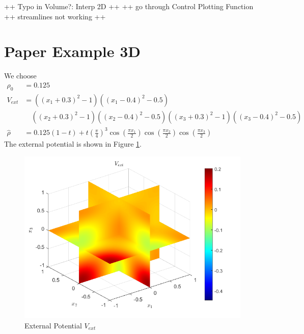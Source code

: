 \documentclass[11pt, a4paper]{article}
\theoremstyle{definition}
\newcommand{\hr}{\widehat \rho}
\begin{document}
++ Typo in Volume?: Interp 2D ++
++ go through Control Plotting Function ++ streamlines not working ++
	
	\section*{Paper Example 3D}
	We choose 
	\begin{align*}
		\rho_0 &= 0.125\\
		V_{ext} &= ((x_1 + 0.3)^2 - 1)((x_1 - 0.4)^2 - 0.5)\\
		&\quad ((x_2 + 0.3)^2 - 1)((x_2 - 0.4)^2 - 0.5)((x_3 + 0.3)^2 - 1)((x_3 - 0.4)^2 - 0.5)\\
		\hr &= 0.125(1-t) + t\left(\frac{\pi}{4}\right)^3\cos\left(\frac{\pi x_1}{2}\right)\cos\left(\frac{\pi x_2}{2}\right)\cos\left(\frac{\pi x_3}{2}\right)
	\end{align*}
	The external potential is shown in Figure \ref{F1}.
	\begin{figure}[h]
		\centering
		\includegraphics[scale=0.7]{Vext3D.png}
		\caption{External Potential $V_{ext}$} 
		\label{F1}
	\end{figure}
	
\end{document}
